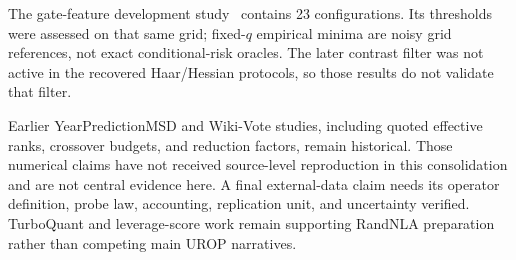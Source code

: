 The gate-feature development study~\cite{project2026} contains 23 configurations. Its thresholds were assessed on that same grid; fixed-$q$ empirical minima are noisy grid references, not exact conditional-risk oracles. The later contrast filter was not active in the recovered Haar/Hessian protocols, so those results do not validate that filter.


Earlier YearPredictionMSD and Wiki-Vote studies, including quoted effective ranks, crossover budgets, and reduction factors, remain historical. Those numerical claims have not received source-level reproduction in this consolidation and are not central evidence here. A final external-data claim needs its operator definition, probe law, accounting, replication unit, and uncertainty verified. TurboQuant and leverage-score work remain supporting RandNLA preparation rather than competing main UROP narratives.
